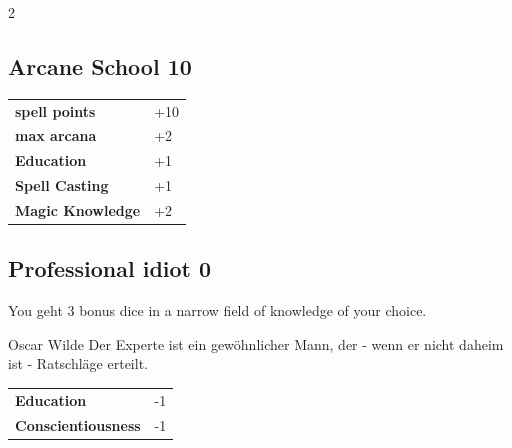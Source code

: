 \begin{multicols}{2}
\begin{tcolorbox}
    \subsection*{Arcane School \hfill \small{10 }}
    \tcblower




\begin{tabular}{@{}ll@{}}
    \textbf{spell points} & +10\\
    \textbf{max arcana} & +2\\
    \textbf{Education} & +1\\
    \textbf{Spell Casting} & +1\\
    \textbf{Magic Knowledge} & +2\\
\end{tabular}


\end{tcolorbox}

\begin{tcolorbox}
    \subsection*{Professional idiot \hfill \small{0 }}
    \tcblower
You geht 3 bonus dice in a narrow field of knowledge of your choice.

\begin{pquote}{Oscar Wilde}
Der Experte ist ein gewöhnlicher Mann, der - wenn er nicht daheim ist - Ratschläge erteilt.
\end{pquote}

\vspace{3mm}

\begin{tabular}{@{}ll@{}}
    \textbf{Education} & -1\\
    \textbf{Conscientiousness} & -1\\
\end{tabular}


\end{tcolorbox}


\end{multicols}

